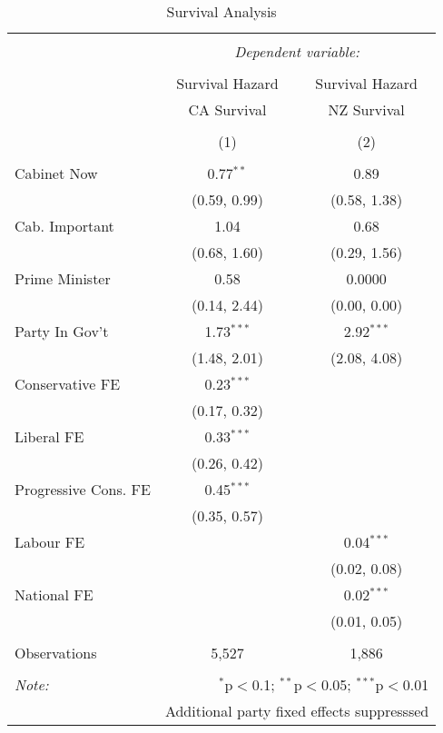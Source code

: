 
\begin{table}[!htb] \centering 
  \caption{Survival Analysis} 
  \label{} 
\begin{tabular}{@{\extracolsep{5pt}}lcc} 
\\[-1.8ex]\hline 
\hline \\[-1.8ex] 
 & \multicolumn{2}{c}{\textit{Dependent variable:}} \\ 
\cline{2-3} 
\\[-1.8ex] & Survival Hazard & Survival Hazard \\ 
 & CA Survival & NZ Survival \\ 
\\[-1.8ex] & (1) & (2)\\ 
\hline \\[-1.8ex] 
 Cabinet Now & 0.77$^{**}$ & 0.89 \\ 
  & (0.59, 0.99) & (0.58, 1.38) \\ 
  Cab. Important & 1.04 & 0.68 \\ 
  & (0.68, 1.60) & (0.29, 1.56) \\ 
  Prime Minister & 0.58 & 0.0000 \\ 
  & (0.14, 2.44) & (0.00, 0.00) \\ 
  Party In Gov't & 1.73$^{***}$ & 2.92$^{***}$ \\ 
  & (1.48, 2.01) & (2.08, 4.08) \\ 
  Conservative FE & 0.23$^{***}$ &  \\ 
  & (0.17, 0.32) &  \\ 
  Liberal FE & 0.33$^{***}$ &  \\ 
  & (0.26, 0.42) &  \\ 
  Progressive Cons. FE & 0.45$^{***}$ &  \\ 
  & (0.35, 0.57) &  \\ 
  Labour FE &  & 0.04$^{***}$ \\ 
  &  & (0.02, 0.08) \\ 
  National FE &  & 0.02$^{***}$ \\ 
  &  & (0.01, 0.05) \\ 
 \hline \\[-1.8ex] 
Observations & 5,527 & 1,886 \\ 
\hline 
\hline \\[-1.8ex] 
\textit{Note:}  & \multicolumn{2}{r}{$^{*}$p$<$0.1; $^{**}$p$<$0.05; $^{***}$p$<$0.01} \\ 
 & \multicolumn{2}{r}{Additional party fixed effects suppresssed} \\ 
\end{tabular} 
\end{table} 
